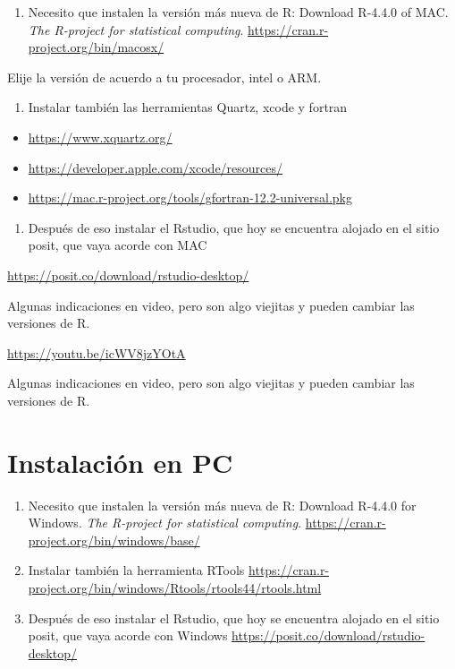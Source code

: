 \documentclass[
  letterpaper,
  DIV=11,
  numbers=noendperiod]{scrreprt}
\providecommand{\tightlist}{%
  \setlength{\itemsep}{0pt}\setlength{\parskip}{0pt}}\usepackage{longtable,booktabs,array}
\begin{document}

\begin{enumerate}
\def\labelenumi{\arabic{enumi}.}
\tightlist
\item
  Necesito que instalen la versión más nueva de R: Download R-4.4.0 of
  MAC. \emph{The R-project for statistical computing}.
  \url{https://cran.r-project.org/bin/macosx/}
\end{enumerate}

Elije la versión de acuerdo a tu procesador, intel o ARM.

\begin{enumerate}
\def\labelenumi{\arabic{enumi}.}
\setcounter{enumi}{1}
\tightlist
\item
  Instalar también las herramientas Quartz, xcode y fortran
\end{enumerate}

\begin{itemize}
\item
  \url{https://www.xquartz.org/}
\item
  \url{https://developer.apple.com/xcode/resources/}
\item
  \url{https://mac.r-project.org/tools/gfortran-12.2-universal.pkg}
\end{itemize}

\begin{enumerate}
\def\labelenumi{\arabic{enumi}.}
\setcounter{enumi}{2}
\tightlist
\item
  Después de eso instalar el Rstudio, que hoy se encuentra alojado en el
  sitio posit, que vaya acorde con MAC
\end{enumerate}

\url{https://posit.co/download/rstudio-desktop/}

Algunas indicaciones en video, pero son algo viejitas y pueden cambiar
las versiones de R.

\url{https://youtu.be/icWV8jzYOtA}

Algunas indicaciones en video, pero son algo viejitas y pueden cambiar
las versiones de R.

\hypertarget{instalaciuxf3n-en-pc}{%
\section*{Instalación en PC}\label{instalaciuxf3n-en-pc}}


\begin{enumerate}
\def\labelenumi{\arabic{enumi}.}
\item
  Necesito que instalen la versión más nueva de R: Download R-4.4.0 for
  Windows. \emph{The R-project for statistical computing}.
  \url{https://cran.r-project.org/bin/windows/base/}
\item
  Instalar también la herramienta RTools
  \url{https://cran.r-project.org/bin/windows/Rtools/rtools44/rtools.html}
\item
  Después de eso instalar el Rstudio, que hoy se encuentra alojado en el
  sitio posit, que vaya acorde con Windows
  \url{https://posit.co/download/rstudio-desktop/}
\end{enumerate}
\end{document}
